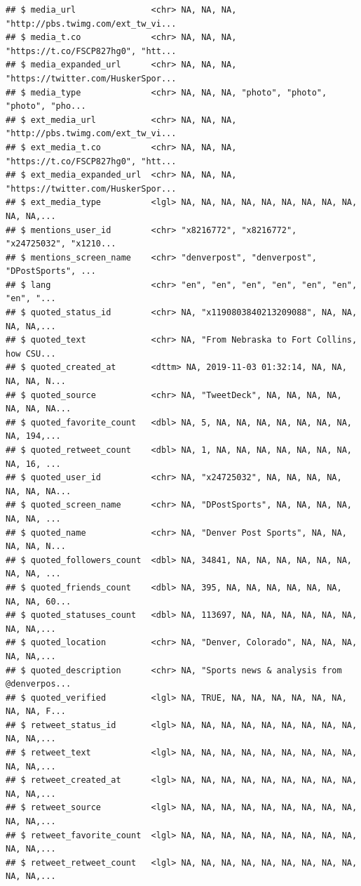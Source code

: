 \documentclass[]{book}
\begin{document}
\begin{verbatim}
## $ media_url               <chr> NA, NA, NA, "http://pbs.twimg.com/ext_tw_vi...
## $ media_t.co              <chr> NA, NA, NA, "https://t.co/FSCP827hg0", "htt...
## $ media_expanded_url      <chr> NA, NA, NA, "https://twitter.com/HuskerSpor...
## $ media_type              <chr> NA, NA, NA, "photo", "photo", "photo", "pho...
## $ ext_media_url           <chr> NA, NA, NA, "http://pbs.twimg.com/ext_tw_vi...
## $ ext_media_t.co          <chr> NA, NA, NA, "https://t.co/FSCP827hg0", "htt...
## $ ext_media_expanded_url  <chr> NA, NA, NA, "https://twitter.com/HuskerSpor...
## $ ext_media_type          <lgl> NA, NA, NA, NA, NA, NA, NA, NA, NA, NA, NA,...
## $ mentions_user_id        <chr> "x8216772", "x8216772", "x24725032", "x1210...
## $ mentions_screen_name    <chr> "denverpost", "denverpost", "DPostSports", ...
## $ lang                    <chr> "en", "en", "en", "en", "en", "en", "en", "...
## $ quoted_status_id        <chr> NA, "x1190803840213209088", NA, NA, NA, NA,...
## $ quoted_text             <chr> NA, "From Nebraska to Fort Collins, how CSU...
## $ quoted_created_at       <dttm> NA, 2019-11-03 01:32:14, NA, NA, NA, NA, N...
## $ quoted_source           <chr> NA, "TweetDeck", NA, NA, NA, NA, NA, NA, NA...
## $ quoted_favorite_count   <dbl> NA, 5, NA, NA, NA, NA, NA, NA, NA, NA, 194,...
## $ quoted_retweet_count    <dbl> NA, 1, NA, NA, NA, NA, NA, NA, NA, NA, 16, ...
## $ quoted_user_id          <chr> NA, "x24725032", NA, NA, NA, NA, NA, NA, NA...
## $ quoted_screen_name      <chr> NA, "DPostSports", NA, NA, NA, NA, NA, NA, ...
## $ quoted_name             <chr> NA, "Denver Post Sports", NA, NA, NA, NA, N...
## $ quoted_followers_count  <dbl> NA, 34841, NA, NA, NA, NA, NA, NA, NA, NA, ...
## $ quoted_friends_count    <dbl> NA, 395, NA, NA, NA, NA, NA, NA, NA, NA, 60...
## $ quoted_statuses_count   <dbl> NA, 113697, NA, NA, NA, NA, NA, NA, NA, NA,...
## $ quoted_location         <chr> NA, "Denver, Colorado", NA, NA, NA, NA, NA,...
## $ quoted_description      <chr> NA, "Sports news & analysis from @denverpos...
## $ quoted_verified         <lgl> NA, TRUE, NA, NA, NA, NA, NA, NA, NA, NA, F...
## $ retweet_status_id       <lgl> NA, NA, NA, NA, NA, NA, NA, NA, NA, NA, NA,...
## $ retweet_text            <lgl> NA, NA, NA, NA, NA, NA, NA, NA, NA, NA, NA,...
## $ retweet_created_at      <lgl> NA, NA, NA, NA, NA, NA, NA, NA, NA, NA, NA,...
## $ retweet_source          <lgl> NA, NA, NA, NA, NA, NA, NA, NA, NA, NA, NA,...
## $ retweet_favorite_count  <lgl> NA, NA, NA, NA, NA, NA, NA, NA, NA, NA, NA,...
## $ retweet_retweet_count   <lgl> NA, NA, NA, NA, NA, NA, NA, NA, NA, NA, NA,...

\end{verbatim}
\end{document}
